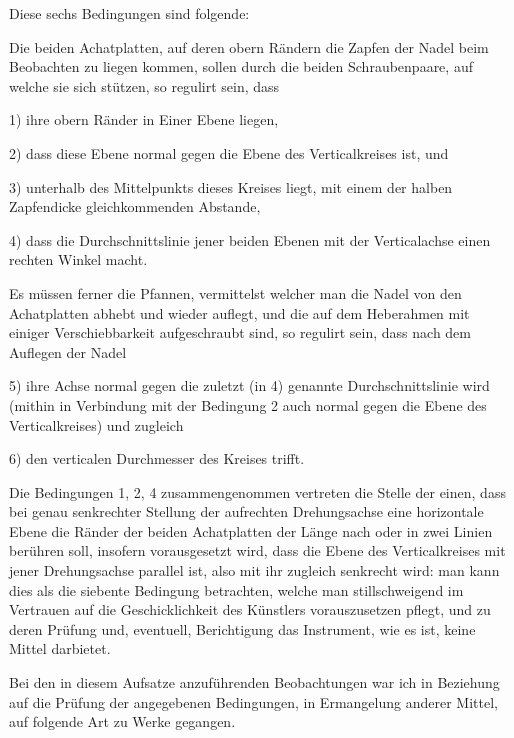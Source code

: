 
\par\clearpage
{}
Diese sechs Bedingungen sind folgende:

Die beiden Achatplatten, auf deren obern Rändern die Zapfen der Nadel beim Beobachten zu liegen kommen, sollen durch die beiden Schraubenpaare, auf welche sie sich stützen, so regulirt sein, dass

1) ihre obern Ränder in Einer Ebene liegen,

2) dass diese Ebene normal gegen die Ebene des Verticalkreises ist, und

3) unterhalb des Mittelpunkts dieses Kreises liegt, mit einem der halben Zapfendicke gleichkommenden Abstande,

4) dass die Durchschnittslinie jener beiden Ebenen mit der Verticalachse einen rechten Winkel macht.

Es müssen ferner die Pfannen, vermittelst welcher man die Nadel von den Achatplatten abhebt und wieder auflegt, und die auf dem Heberahmen mit einiger Verschiebbarkeit aufgeschraubt sind, so regulirt sein, dass nach dem Auflegen der Nadel

5) ihre Achse normal gegen die zuletzt (in 4) genannte Durchschnittslinie wird (mithin in Verbindung mit der Bedingung 2 auch normal gegen die Ebene des Verticalkreises) und zugleich

6) den verticalen Durchmesser des Kreises trifft.

Die Bedingungen 1, 2, 4 zusammengenommen vertreten die Stelle der einen, dass bei genau senkrechter Stellung der aufrechten Drehungsachse eine horizontale Ebene die Ränder der beiden Achatplatten der Länge nach oder in zwei Linien berühren soll, insofern vorausgesetzt wird, dass die Ebene des Verticalkreises mit jener Drehungsachse parallel ist, also mit ihr zugleich senkrecht wird: man kann dies als die siebente Bedingung betrachten, welche man stillschweigend im Vertrauen auf die Geschicklichkeit des Künstlers vorauszusetzen pflegt, und zu deren Prüfung und, eventuell, Berichtigung das Instrument, wie es ist, keine Mittel darbietet.

Bei den in diesem Aufsatze anzuführenden Beobachtungen war ich in Beziehung auf die Prüfung der angegebenen Bedingungen, in Ermangelung anderer Mittel, auf folgende Art zu Werke gegangen.

